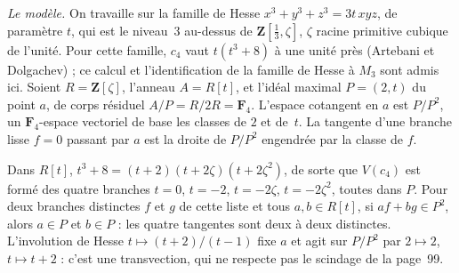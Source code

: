 \noindent\emph{Le modèle.} On travaille sur la famille de Hesse $x^3 + y^3 + z^3 = 3t\,xyz$, de paramètre $t$, qui est le niveau~$3$ au-dessus de $\mathbf Z[\frac13, \zeta]$, $\zeta$ racine primitive cubique de l'unité. Pour cette famille, $c_4$ vaut $t(t^3 + 8)$ à une unité près (Artebani et Dolgachev) ; ce calcul et l'identification de la famille de Hesse à $M_3$ sont admis ici. Soient $R = \mathbf Z[\zeta]$, l'anneau $A = R[t]$, et l'idéal maximal $P = (2, t)$ du point $a$, de corps résiduel $A/P = R/2R = \mathbf F_4$. L'espace cotangent en $a$ est $P/P^2$, un $\mathbf F_4$-espace vectoriel de base les classes de $2$ et de~$t$. La tangente d'une branche lisse $f = 0$ passant par $a$ est la droite de $P/P^2$ engendrée par la classe de $f$.

\begin{encadre}
\begin{contrexemple}
Dans $R[t]$, $t^3 + 8 = (t + 2)(t + 2\zeta)(t + 2\zeta^2)$, de sorte que $V(c_4)$ est formé des quatre branches $t = 0$, $t = -2$, $t = -2\zeta$, $t = -2\zeta^2$, toutes dans $P$. Pour deux branches distinctes $f$ et $g$ de cette liste et tous $a, b \in R[t]$, si $af + bg \in P^2$, alors $a \in P$ et $b \in P$ : les quatre tangentes sont deux à deux distinctes. L'involution de Hesse $t \mapsto (t + 2)/(t - 1)$ fixe $a$ et agit sur $P/P^2$ par $2 \mapsto 2$, $t \mapsto t + 2$ : c'est une transvection, qui ne respecte pas le scindage de la page~99.
\end{contrexemple}
\end{encadre}

